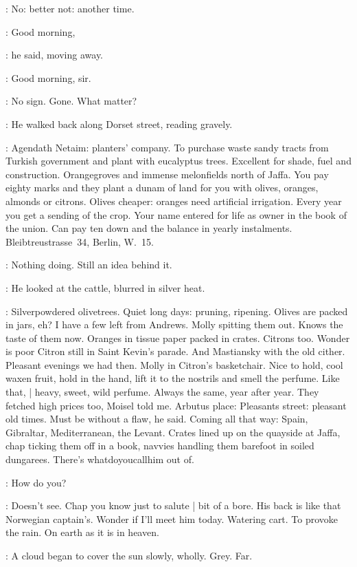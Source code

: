 \BloomInt:
No: better not: another time.

\Bloom:
Good morning,

:
he said, moving away.

\Dlugacz:
Good morning, sir.

\BloomInt:
No sign.
Gone.
What matter?

:
He walked back along Dorset street, reading gravely.

\BloomInt:
Agendath Netaim: planters' company.
To purchase waste sandy tracts from Turkish government
and plant with eucalyptus trees.
Excellent for shade, fuel and construction.
Orangegroves and immense melonfields north of Jaffa.
You pay eighty marks and they plant a dunam of land for you
with olives, oranges, almonds or citrons.
Olives cheaper: oranges need artificial irrigation.
Every year you get a sending of the crop.
Your name entered for life as owner in the book of the union.
Can pay ten down and the balance in yearly instalments.
Bleibtreustrasse~34, Berlin, W.~15.

\BloomInt:
Nothing doing.
Still an idea behind it.

:
He looked at the cattle, blurred in silver heat.

\BloomInt:
Silverpowdered olivetrees.
Quiet long days:
pruning, ripening.
Olives are packed in jars, eh?
I have a few left from Andrews.
Molly spitting them out.
Knows the taste of them now.
Oranges in tissue paper packed in crates.
Citrons too.
Wonder is poor Citron still in Saint Kevin's parade.
And Mastiansky with the old cither.
Pleasant evenings we had then.
Molly in Citron's basketchair.
Nice to hold, cool waxen fruit, hold in the hand,
lift it to the nostrils and smell the perfume.
Like that, |
heavy, sweet, wild perfume.
Always the same, year after year.
They fetched high prices too, Moisel told me.
Arbutus place: Pleasants street: pleasant old times.
Must be without a flaw, he said.
Coming all that way:
Spain, Gibraltar, Mediterranean, the Levant.
Crates lined up on the quayside at Jaffa,
chap ticking them off in a book,
navvies handling them barefoot in soiled dungarees.
There's whatdoyoucallhim out of.

\Bloom:
How do you?

\BloomInt:
Doesn't see.
Chap you know just to salute |
bit of a bore.
His back is like that Norwegian captain's.
Wonder if I'll meet him today.
Watering cart.
To provoke the rain.
On earth as it is in heaven.

:
A cloud began to cover the sun slowly, wholly.
Grey.
Far.


